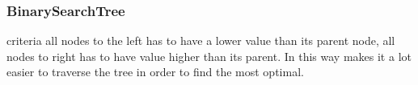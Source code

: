 \subsubsection{BinarySearchTree}
criteria all nodes to the left has to have a lower value than its parent node, all nodes to right has to have value higher than its parent. In this way makes it a lot easier to traverse the tree in order to find the most optimal.